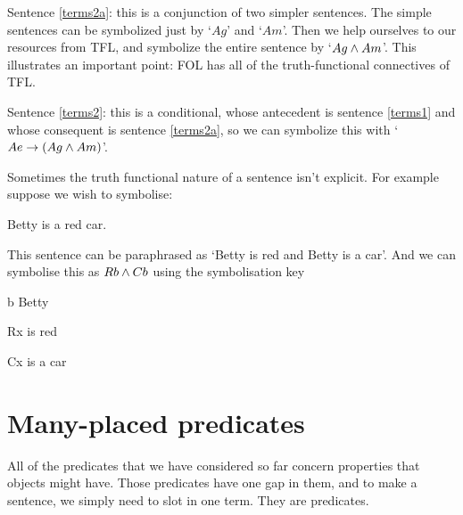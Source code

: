 Sentence \ref{terms2a}: this is a conjunction of two simpler sentences. The simple sentences can be symbolized just by `$Ag$' and `$Am$'. Then we help ourselves to our resources from TFL, and symbolize the entire sentence by `$Ag \wedge Am$'. This illustrates an important point: FOL has all of the truth-functional connectives of TFL.

Sentence \ref{terms2}: this is a conditional, whose antecedent is sentence \ref{terms1} and whose consequent is sentence \ref{terms2a}, so we can symbolize this with `$Ae \rightarrow (Ag \wedge Am)$'.

Sometimes the truth functional nature of a sentence isn't explicit. For example suppose we wish to symbolise:
\begin{earg}
\item[\ex{betty1}]Betty is a red car.
\end{earg}
This sentence can be paraphrased as `Betty is red and Betty is a car'. And we can symbolise this as $Rb\wedge Cb$ using the symbolisation key \begin{ekey}
\item[b] Betty
\item[Rx]  is red
\item[Cx]  is a car
\end{ekey}





\section{Many-placed predicates}
All of the predicates that we have considered so far concern properties that objects might have. Those predicates have one gap in them, and to make a sentence, we simply need to slot in one term. They are  predicates.

